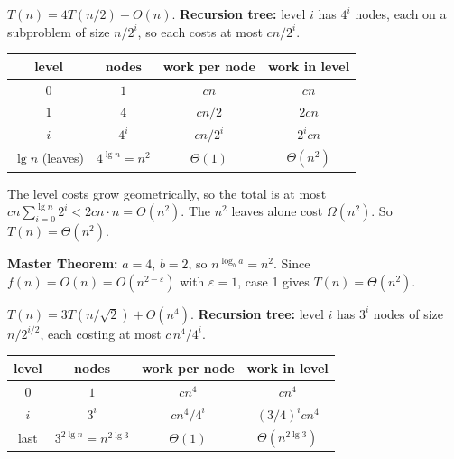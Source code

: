 \documentclass[12pt,twoside]{article}
\begin{document}


\begin{problems}

\problem  %

\begin{problemparts}
\problempart %
$T(n) = 4T(n/2) + O(n)$. \textbf{Recursion tree:} level $i$ has $4^i$ nodes, each on a
subproblem of size $n/2^i$, so each costs at most $cn/2^i$.

\begin{center}
\begin{tabular}{c|c|c|c}
level & nodes & work per node & work in level \\ \hline
$0$ & $1$ & $cn$ & $cn$ \\
$1$ & $4$ & $cn/2$ & $2cn$ \\
$i$ & $4^i$ & $cn/2^i$ & $2^i cn$ \\
$\lg n$ (leaves) & $4^{\lg n} = n^2$ & $\Theta(1)$ & $\Theta(n^2)$
\end{tabular}
\end{center}

The level costs grow geometrically, so the total is at most
$cn\sum_{i=0}^{\lg n}2^i < 2cn\cdot n = O(n^2)$. The $n^2$ leaves alone cost
$\Omega(n^2)$. So $T(n) = \Theta(n^2)$.

\textbf{Master Theorem:} $a=4$, $b=2$, so $n^{\log_b a} = n^2$. Since $f(n)=O(n)=O(n^{2-\varepsilon})$
with $\varepsilon = 1$, case 1 gives $T(n)=\Theta(n^2)$.

\problempart %
$T(n) = 3T(n/\sqrt2) + O(n^4)$. \textbf{Recursion tree:} level $i$ has $3^i$ nodes of size
$n/2^{i/2}$, each costing at most $c\,n^4/4^i$.

\begin{center}
\begin{tabular}{c|c|c|c}
level & nodes & work per node & work in level \\ \hline
$0$ & $1$ & $cn^4$ & $cn^4$ \\
$i$ & $3^i$ & $cn^4/4^i$ & $(3/4)^i cn^4$ \\
last & $3^{2\lg n} = n^{2\lg 3}$ & $\Theta(1)$ & $\Theta(n^{2\lg 3})$
\end{tabular}
\end{center}


\end{problemparts}
\end{problems}
\end{document}
